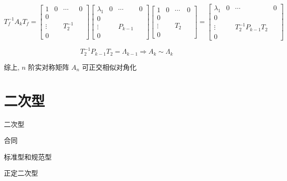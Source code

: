 \begin{theorem}[实对称矩阵的相似对角化]
	$$T_{f}^{-1}A_{k}T_{f} = 
	\begin{bmatrix}
		1           & 0 & \cdots     & 0\\
		0           &   &            & \\
		\vdots      &   & T_{2}^{-1} & \\
		0           &   &            &
	\end{bmatrix}
	\begin{bmatrix}
		\lambda_{1} & 0 & \cdots  & 0\\
		0           &   &         & \\
		\vdots      &   & P_{k-1} & \\
		0           &   &         &  
	\end{bmatrix}
	\begin{bmatrix}
		1           & 0 & \cdots & 0\\
		0           &   &        & \\
		\vdots      &   & T_{2}  & \\
		0           &   &        &
	\end{bmatrix} = 
	\begin{bmatrix}
		\lambda_{1} & 0 & \cdots                 & 0\\
		0           &   &                        & \\
		\vdots      &   & T_{2}^{-1}P_{k-1}T_{2} & \\
		0           &   &                        &  
	\end{bmatrix}$$

	$$T_{2}^{-1}P_{k-1}T_{2} = \varLambda_{k-1} \Rightarrow A_{k}\sim \varLambda_{k}$$

	综上, $n$ 阶实对称矩阵 $A_{n}$ 可正交相似对角化
\end{theorem}



\chapter{二次型}
\begin{introduction}
	\item 二次型
	\item 合同
	\item 标准型和规范型
	\item 正定二次型
\end{introduction}
